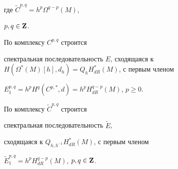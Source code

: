 где $\widetilde C^{p,q}=h^p \Omega^{q-p}(M)$,


$p, q\in {\bold Z}$.


По комплексу $C^{p,q}$ строится


спектральная последовательность $E$, сходящаяся к $H(\Omega^*(M)[h],


d_h)= Q_hH_{dR}^*(M)$, с первым членом


$E_1^{p,q}=h^p H^q(C^{p,*},d)=h^pH_{dR}^{q-p}(M)$, $p\ge 0$.


По комплексу  $\widetilde C^{p,q}$ строится


спектральная последовательность $\widetilde E$,


сходящаяся к $Q_{h,h^{-1}}H_{dR}^*(M)$, с первым членом


$\widetilde E_1^{p,q}=h^pH_{dR}^{q-p}(M)$, $p,q \in {\bold Z}$.


